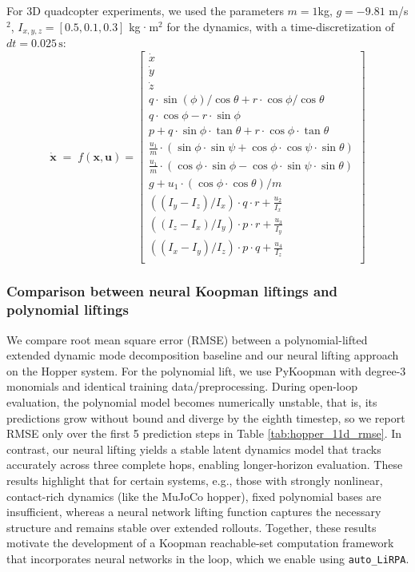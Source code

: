 \noindent For 3D quadcopter experiments, we used the parameters $m=1$kg, $g=-9.81$ m/s$^2$, $I_{x,y,z}=[0.5,0.1,0.3]$ kg·m$^2$ for the dynamics, with a time-discretization of $dt = 0.025\,\mathrm{s}$:
\begin{equation}
    \dot{\mathbf{x}} \;=\; f(\mathbf{x},\mathbf{u})=
    \begin{bmatrix}
        \dot{x} \\
        \dot{y} \\
        \dot{z} \\
        q \cdot \sin(\phi)/\cos{\theta}+r\cdot \cos{\phi}/\cos{\theta} \\
        q \cdot \cos{\phi} - r\cdot \sin{\phi} \\
        p + q \cdot \sin{\phi}\cdot \tan{\theta} +r\cdot \cos{\phi} \cdot \tan{\theta} \\
        \frac{u_1}{m} \cdot (\sin{\phi} \cdot \sin{\psi} + \cos{\phi} \cdot \cos{\psi} \cdot \sin{\theta}) \\ 
        \frac{u_1}{m} \cdot (\cos{\phi} \cdot \sin{\phi} - \cos{\phi} \cdot \sin{\psi} \cdot \sin{\theta}) \\ 
        g + u_1 \cdot (\cos{\phi} \cdot \cos{\theta}) / m\\
        ((I_y - I_z) / I_x) \cdot q\cdot r + \frac{u_2}{I_x} \\
        ((I_z - I_x) / I_y) \cdot p\cdot r + \frac{u_3}{I_y} \\
        ((I_x - I_y) / I_z) \cdot p\cdot q + \frac{u_4}{I_z} \\
    \end{bmatrix}
    \label{eq:3D_Quad_dyn}
\end{equation}

\subsubsection{Comparison between neural Koopman liftings and polynomial liftings}\label{app:polynomial}
We compare root mean square error (RMSE) between a polynomial-lifted extended dynamic mode decomposition baseline and our neural lifting approach on the Hopper system. For the polynomial lift, we use PyKoopman \citep{pykoopman} with degree-3 monomials and identical training data/preprocessing. During open-loop evaluation, the polynomial model becomes numerically unstable, that is, its predictions grow without bound and diverge by the eighth timestep, so we report RMSE only over the first 5 prediction steps in Table \ref{tab:hopper_11d_rmse}. In contrast, our neural lifting yields a stable latent dynamics model that tracks accurately across three complete hops, enabling longer-horizon evaluation. These results highlight that for certain systems, e.g., those with strongly nonlinear, contact-rich dynamics (like the MuJoCo hopper), fixed polynomial bases are insufficient, whereas a neural network lifting function captures the necessary structure and remains stable over extended rollouts. Together, these results motivate the development of a Koopman reachable-set computation framework that incorporates neural networks in the loop, which we enable using \texttt{auto\_LiRPA}.

